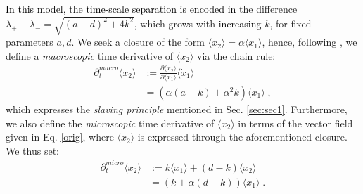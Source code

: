 \documentclass[a4paper,twoside]{article}      %
\theoremstyle{definition}
\newcommand{\AM}{\textcolor{black}}
\begin{document}
\AM{In this model, the time-scale separation is encoded in}  the difference $\lambda_+-\lambda_-=\sqrt{(a-d)^2+4k^2}$, which grows with \AM{increasing} $k$, for fixed parameters $a,d$.
We seek a closure of the form
$\langle x_2\rangle=\alpha \langle x_1\rangle$, hence, following \cite{CDM22}, we define a \textit{macroscopic} time derivative of $\langle x_2 \rangle$ via the chain rule:
\begin{align*}
\partial_t^{macro} \langle x_2 \rangle&:=\frac{\partial \langle x_2\rangle}{\partial \langle x_1\rangle}\langle\dot{x}_1\rangle
\\&=
(\alpha (a-k)+ \alpha^2 k)\langle x_1\rangle \;,
\end{align*}  
which expresses the \textit{slaving principle} mentioned in Sec. \ref{sec:sec1}. Furthermore, we also define the \textit{microscopic} time derivative of $\langle x_2 \rangle$ in terms of the vector field given in Eq. \eqref{orig}, where $\langle x_2\rangle$ is expressed through the aforementioned closure. We thus set:
\begin{align*}
\partial_t^{micro} \langle x_2 \rangle&:=k \langle x_1\rangle+(d-k)\langle x_2\rangle
\\
&=(k+\alpha (d-k))\langle x_1\rangle \;.
\end{align*}
\end{document}
